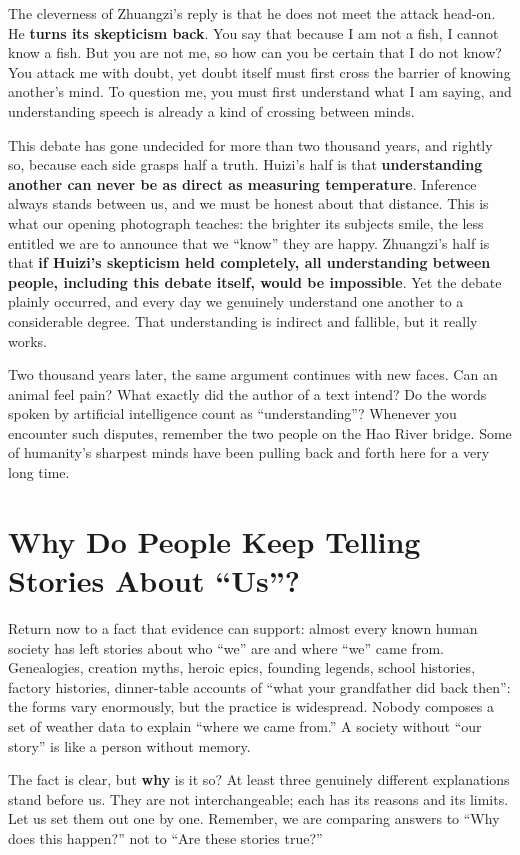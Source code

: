 The cleverness of Zhuangzi's reply is that he does not meet the attack head-on. He \textbf{turns its skepticism back}. You say that because I am not a fish, I cannot know a fish. But you are not me, so how can you be certain that I do not know? You attack me with doubt, yet doubt itself must first cross the barrier of knowing another's mind. To question me, you must first understand what I am saying, and understanding speech is already a kind of crossing between minds.

This debate has gone undecided for more than two thousand years, and rightly so, because each side grasps half a truth. Huizi's half is that \textbf{understanding another can never be as direct as measuring temperature}. Inference always stands between us, and we must be honest about that distance. This is what our opening photograph teaches: the brighter its subjects smile, the less entitled we are to announce that we ``know'' they are happy. Zhuangzi's half is that \textbf{if Huizi's skepticism held completely, all understanding between people, including this debate itself, would be impossible}. Yet the debate plainly occurred, and every day we genuinely understand one another to a considerable degree. That understanding is indirect and fallible, but it really works.

Two thousand years later, the same argument continues with new faces. Can an animal feel pain? What exactly did the author of a text intend? Do the words spoken by artificial intelligence count as ``understanding''? Whenever you encounter such disputes, remember the two people on the Hao River bridge. Some of humanity's sharpest minds have been pulling back and forth here for a very long time.

\section{Why Do People Keep Telling Stories About ``Us''?}
Return now to a fact that evidence can support: almost every known human society has left stories about who ``we'' are and where ``we'' came from. Genealogies, creation myths, heroic epics, founding legends, school histories, factory histories, dinner-table accounts of ``what your grandfather did back then'': the forms vary enormously, but the practice is widespread. Nobody composes a set of weather data to explain ``where we came from.'' A society without ``our story'' is like a person without memory.

The fact is clear, but \textbf{why} is it so? At least three genuinely different explanations stand before us. They are not interchangeable; each has its reasons and its limits. Let us set them out one by one. Remember, we are comparing answers to ``Why does this happen?'' not to ``Are these stories true?''

